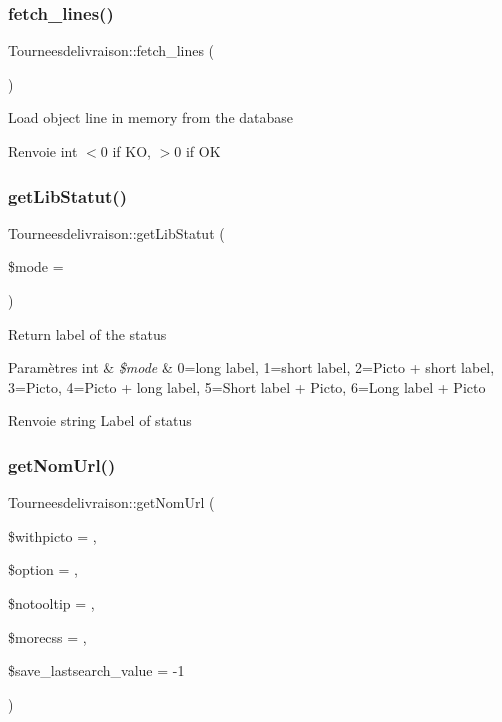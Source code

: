\subsubsection{\texorpdfstring{fetch\+\_\+lines()}{fetch\_lines()}}
{\footnotesize\ttfamily Tourneesdelivraison\+::fetch\+\_\+lines (\begin{DoxyParamCaption}{ }\end{DoxyParamCaption})}

Load object line in memory from the database

\begin{DoxyReturn}{Renvoie}
int $<$0 if KO, $>$0 if OK 
\end{DoxyReturn}
\mbox{\label{classTourneesdelivraison_a84f62d04a939395511ff0fd82ab8ac5e}} 
\subsubsection{\texorpdfstring{get\+Lib\+Statut()}{getLibStatut()}}
{\footnotesize\ttfamily Tourneesdelivraison\+::get\+Lib\+Statut (\begin{DoxyParamCaption}\item[{}]{\$mode = {} }\end{DoxyParamCaption})}

Return label of the status


\begin{DoxyParams}[1]{Paramètres}
int & {\em \$mode} & 0=long label, 1=short label, 2=Picto + short label, 3=Picto, 4=Picto + long label, 5=Short label + Picto, 6=Long label + Picto \\
\hline
\end{DoxyParams}
\begin{DoxyReturn}{Renvoie}
string Label of status 
\end{DoxyReturn}
\mbox{\label{classTourneesdelivraison_a69ecf121daa602cf4536d40480f49fa8}} 
\subsubsection{\texorpdfstring{get\+Nom\+Url()}{getNomUrl()}}
{\footnotesize\ttfamily Tourneesdelivraison\+::get\+Nom\+Url (\begin{DoxyParamCaption}\item[{}]{\$withpicto = {},  }\item[{}]{\$option = {\ttfamily \textquotesingle{}\textquotesingle{}},  }\item[{}]{\$notooltip = {},  }\item[{}]{\$morecss = {\ttfamily \textquotesingle{}\textquotesingle{}},  }\item[{}]{\$save\+\_\+lastsearch\+\_\+value = {\ttfamily -\/1} }\end{DoxyParamCaption})}

